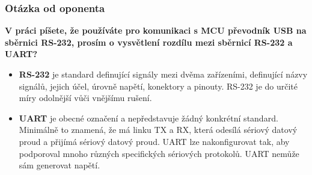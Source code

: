 \documentclass[%
  12pt,       				%
	t,                  %
	aspectratio=1610,   %
	unicode,						%
]{beamer}				    	%
\begin{document}
\begin{frame} 
	\frametitle{Otázka od oponenta}
	
	{\bf V práci píšete, že používáte pro komunikaci s MCU převodník USB na 
	sběrnici RS-232, prosím o vysvětlení rozdílu mezi sběrnicí RS-232 a UART? }
	
	\begin{itemize}
		\item {\bf RS-232} je standard definující signály mezi dvěma zařízeními, 
		definující názvy signálů, jejich účel, úrovně napětí, konektory a 
		pinouty. RS-232 je do určité míry odolnější vůči vnějšímu rušení. 

		\item {\bf UART} je obecné označení a nepředstavuje žádný konkrétní 
		standard. Minimálně to znamená, že má linku TX a RX, která odesílá 
		sériový datový proud a přijímá sériový datový proud.
		UART lze nakonfigurovat tak, aby podporoval mnoho různých specifických 
		sériových protokolů. UART nemůže sám generovat napětí.
	\end{itemize}	
\end{frame}

\end{document}
